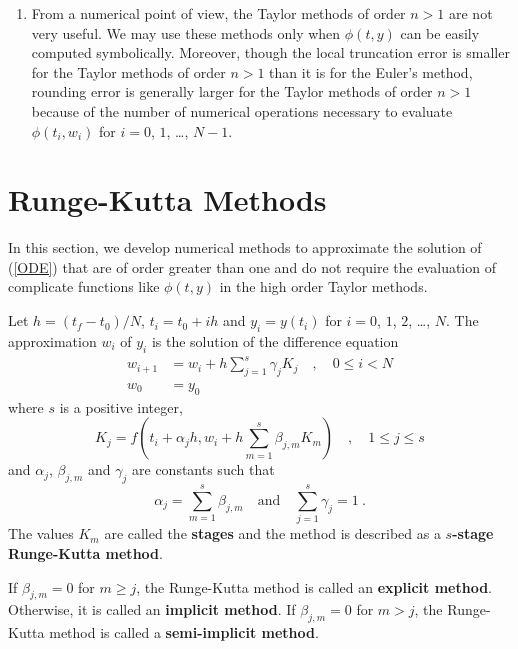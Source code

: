 \begin{rmkList}
\begin{enumerate}
\[\]
for $\xi_i \in [t_i,t_{i+1}]$.  If there exists a constant $M$ such
that $\DS |y^{(n+1)}(t)| \leq M$ for all $t\in [t_0,t_f]$, then
$\DS |\tau_{i+1}(h)| \leq \tau(h) \equiv M|h|^n/(n+1)!$ for
all $i$ and $\DS \tau(h)  = O(h^n)$ near the origin.  This
justifies the name Taylor method of order $n$.
\item From a numerical point of view, the Taylor methods of order
$n>1$ are not very useful.  We may use these methods only when 
$\phi(t,y)$ can be easily computed symbolically.  Moreover, though the
local truncation error is smaller for the Taylor methods of order
$n>1$ than it is for the Euler's method, rounding error is generally
larger for the Taylor methods of order $n>1$ because of the number of
numerical operations necessary to evaluate $\phi(t_i,w_i)$ for $i=0$,
$1$, \ldots, $N-1$.
\end{enumerate}
\end{rmkList}

\section{Runge-Kutta Methods}

In this section, we develop numerical methods to approximate the
solution of (\ref{ODE}) that are of order greater than one and do
not require the evaluation of complicate functions like $\phi(t,y)$ in
the high order Taylor methods.

\begin{defn}
Let $h=(t_f-t_0)/N$, $t_i=t_0+ih$ and $y_i = y(t_i)$ for $i=0$,
$1$, $2$, \ldots, $N$.  The approximation $w_i$ of $y_i$ is the solution of
the difference equation
\begin{align*}
w_{i+1} &= w_i + h \sum_{j=1}^s \gamma_j K_j \quad, \quad 0 \leq i < N \\
w_0 &= y_0
\end{align*}
where $s$ is a positive integer,
\[
K_j = f(t_i + \alpha_j h, w_i + h \sum_{m=1}^s \beta_{j,m} K_m)
\quad, \quad 1 \leq j \leq s
\]
and $\alpha_j$, $\beta_{j,m}$ and $\gamma_j$ are constants such that
\begin{equation}\label{GFRKMcond}
  \alpha_j = \sum_{m=1}^s \beta_{j,m} \quad \text{and} \quad
  \sum_{j=1}^s \gamma_j = 1 \ .
\end{equation}
The values $K_m$ are called the
{\bfseries stages} and the method is
described as a
{\bfseries $s$-stage Runge-Kutta method}.

If $\beta_{j,m} = 0$ for $m\geq j$, the Runge-Kutta method is called
an {\bfseries explicit method}.  Otherwise,
it is called an {\bfseries implicit method}.
If $\beta_{j,m} = 0$ for $m > j$, the Runge-Kutta method is called a
{\bfseries semi-implicit method}.
\label{GFRKM}
\end{defn}

